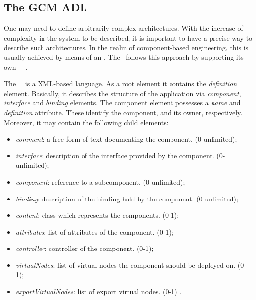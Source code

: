 	
\subsection{The GCM ADL}
\label{sub:gcmadl}

		
		One may need to define arbitrarily complex architectures. With the 
	increase of complexity in the system to be described, it is important to have a precise way
	to describe such architectures. In the realm of component-based engineering, this is usually achieved 
	by means of an \adl. The \gcm\ follows this approach by supporting
	its own \gcm\ \adl\ \cite{ETSI2009:GCMADL}. 
	
		The \gcm\ \adl\ is a XML-based language. As a root element it 
		contains the \textit{definition} element. Basically, it describes the structure of the application
		via \textit{component}, \textit{interface} and 
		\textit{binding} elements. The component element possesses a \textit{name} and 
		\textit{definition} attribute. These identify the component, and its owner, respectively.
	   Moreover, it may contain the following child elements:
	   
	   \begin{itemize}
	   		\item \textit{comment}: a free form of text documenting the component. (0-unlimited);
	   		
	   		\item \textit{interface}: description of the interface provided by the component. (0-unlimited);
	   		
	   		\item \textit{component}: reference to a subcomponent. (0-unlimited);
	   		
	   		\item \textit{binding}: description of the binding hold by the component. (0-unlimited);
	   		
	   		\item \textit{content}: class which represents the components. (0-1);
	   		
	   		\item \textit{attributes}: list of attributes of the component. (0-1);
	   		
			\item \textit{controller}: controller of the component. (0-1);
			
			\item \textit{virtualNodes}: 	list of virtual nodes the component should be deployed on. (0-1);
			
			\item \textit{exportVirtualNodes}:  list of export virtual nodes. (0-1)	.
	   		
		\end{itemize}	   	

